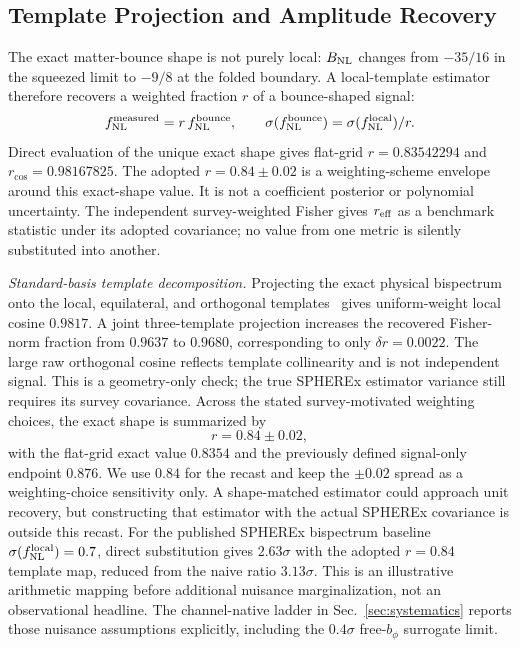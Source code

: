 \documentclass[aps,prd,twocolumn,superscriptaddress,showpacs,preprintnumbers,nofootinbib,longbibliography,floatfix]{revtex4-2}
\newcommand{\fnl}{f_{\rm NL}}
\newcommand{\BNL}{B_{\rm NL}}
\begin{document}
\subsection{Template Projection and Amplitude Recovery}
\label{sec:template}

The exact matter-bounce shape is not purely local: $\BNL$ changes from $-35/16$ in the squeezed limit to $-9/8$ at the folded boundary. A local-template estimator therefore recovers a weighted fraction $r$ of a bounce-shaped signal:
\begin{equation}
\fnl^{\rm measured}=r\,\fnl^{\rm bounce},\qquad
\sigma(\fnl^{\rm bounce})=\sigma(\fnl^{\rm local})/r .
\label{eq:projection}
\end{equation}
Direct evaluation of the unique exact shape gives flat-grid $r=0.83542294$ and $r_{\cos}=0.98167825$. The adopted $r=0.84\pm0.02$ is a weighting-scheme envelope around this exact-shape value. It is not a coefficient posterior or polynomial uncertainty. The independent survey-weighted Fisher gives $r_{\rm eff}$ as a benchmark statistic under its adopted covariance; no value from one metric is silently substituted into another.
\par \emph{Standard-basis template decomposition.} Projecting the exact physical bispectrum onto the local, equilateral, and orthogonal templates~\cite{Senatore:2010} gives uniform-weight local cosine $0.9817$. A joint three-template projection increases the recovered Fisher-norm fraction from $0.9637$ to $0.9680$, corresponding to only $\delta r=0.0022$. The large raw orthogonal cosine reflects template collinearity and is not independent signal. This is a geometry-only check; the true SPHEREx estimator variance still requires its survey covariance.
Across the stated survey-motivated weighting choices, the exact shape is summarized by
\begin{equation}
r=0.84\pm0.02 ,
\label{eq:r_noise}
\end{equation}
with the flat-grid exact value $0.8354$ and the previously defined signal-only endpoint $0.876$. We use $0.84$ for the recast and keep the $\pm0.02$ spread as a weighting-choice sensitivity only. A shape-matched estimator could approach unit recovery, but constructing that estimator with the actual SPHEREx covariance is outside this recast.
For the published SPHEREx bispectrum baseline $\sigma(\fnl^{\rm local})=0.7$, direct substitution gives $2.63\sigma$ with the adopted $r=0.84$ template map, reduced from the naive ratio $3.13\sigma$. This is an illustrative arithmetic mapping before additional nuisance marginalization, not an observational headline. The channel-native ladder in Sec.~\ref{sec:systematics} reports those nuisance assumptions explicitly, including the $0.4\sigma$ free-$b_\phi$ surrogate limit.
\end{document}
